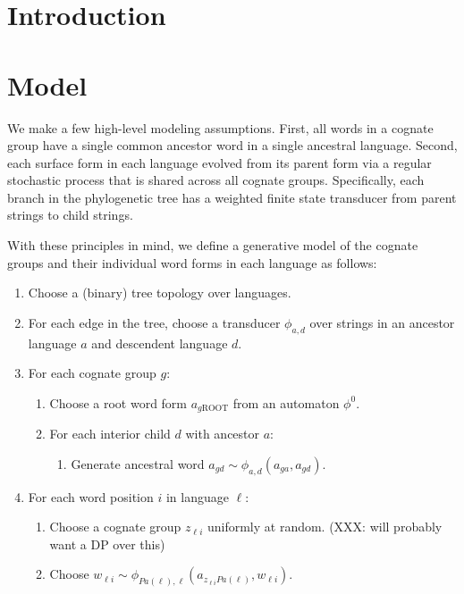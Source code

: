\documentclass[11pt]{article}
\title{}
\author{}
\date{}
\begin{document}
\maketitle
\begin{abstract}
\end{abstract}
\section{Introduction}
\section{Model}

We make a few high-level modeling assumptions. First, all words in
a cognate group have a single common ancestor word in a single
ancestral language. Second, each surface form in each language
evolved from its parent form via a regular stochastic process that
is shared across all cognate groups. Specifically, each branch in
the phylogenetic tree has a weighted finite state transducer from
parent strings to child strings.

With these principles in mind, we define a generative model of the cognate groups and their individual word forms in each language as follows:
\begin{enumerate}
  \item Choose a (binary) tree topology over languages.
  \item For each edge in the tree, choose a transducer $\phi_{a,d}$ over strings in an ancestor language $a$ and descendent language $d$.
  \item For each cognate group $g$:
    \begin{enumerate}
      \item Choose a root word form $a_{g\mathrm{ROOT}}$ from an automaton $\phi^0$.
      \item For each interior child $d$ with ancestor $a$:
        \begin{enumerate}
          \item Generate ancestral word $a_{gd} \sim \phi_{a,d}(a_{ga},a_{gd})$.
        \end{enumerate}
    \end{enumerate}
  \item For each word position $i$ in language $\ell$:
    \begin{enumerate}
      \item Choose a cognate group $z_{\ell i}$ uniformly at random. (XXX: will probably want a DP over this)
      \item Choose $w_{\ell i} \sim \phi_{Pa(\ell),\ell}(a_{z_{\ell i}Pa(\ell)},w_{\ell i})$.
    \end{enumerate}
\end{enumerate}
\end{document}
